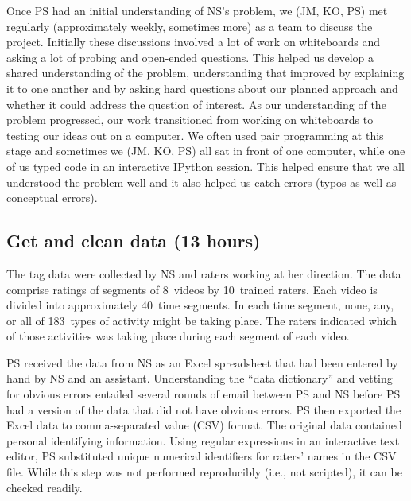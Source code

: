 \documentclass[]{article}
\begin{document}
Once PS had an initial understanding of NS's problem, we (JM, KO, PS) met
regularly (approximately weekly, sometimes more) as a team to discuss the
project.
Initially these discussions involved a lot of work on whiteboards and asking a
lot of probing and open-ended questions.
This helped us develop a shared understanding of the problem, understanding
that improved by explaining it to one
another and by asking hard questions about our planned approach and whether
it could address the question of interest.
As our understanding of the problem progressed, our work transitioned from
working on whiteboards to testing our ideas out on a computer.
We often used pair programming at this stage and sometimes we (JM, KO, PS)
all sat in front of one computer, while one of us typed code in an interactive
IPython session.
This helped ensure that we all understood the problem well and it also helped
us catch errors (typos as well as conceptual errors).

\subsection{Get and clean data (13 hours)}

The tag data were collected by NS and raters working at her direction.
The data comprise ratings of segments of 8~videos by 10~trained raters.
Each video is divided into approximately 40~time segments.
In each time segment, none, any, or all of 183~types of activity might be
taking place.
The raters indicated which of those activities was taking place during each
segment of each video.

PS received the data from NS as an Excel spreadsheet that had been entered
by hand by NS and an assistant.
Understanding the ``data dictionary'' and vetting for obvious errors entailed
several rounds of email between PS and NS before PS had a version of the data
that did not have obvious errors.
PS then exported the Excel data to comma-separated value (CSV) format.
The original data contained personal identifying information.
Using regular expressions in an interactive text editor, PS substituted
unique numerical identifiers for raters' names in the CSV file.
While this step was not performed reproducibly (i.e., not scripted), it can be
checked readily.
\end{document}
